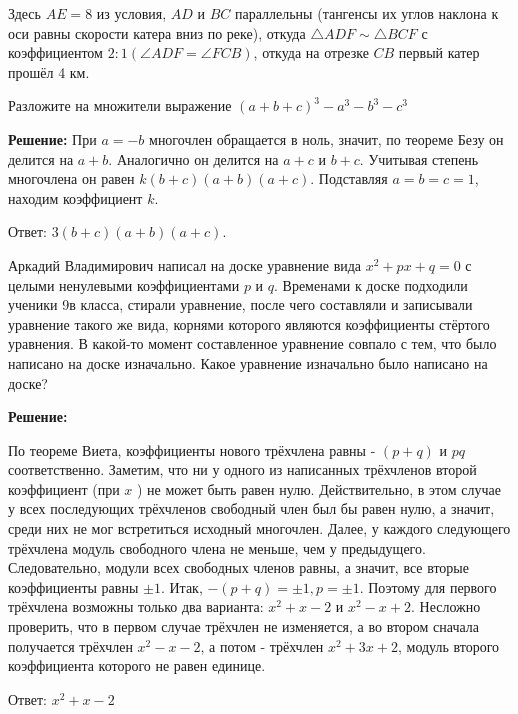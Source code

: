 Здесь $A E=8$ из условия, $A D$ и $B C$ параллельны (тангенсы их углов наклона к оси равны скорости катера вниз по реке), откуда $\triangle A D F \sim \triangle B C F$ с коэффициентом $2: 1(\angle A D F=\angle F C B)$, откуда на отрезке $C B$ первый катер прошёл 4 км.

Разложите на множители выражение $(a + b + c)^3 - a^3 - b^3 - c^3$

\textbf{Решение:}
При $a=-b$ многочлен обращается в ноль, значит, по теореме Безу он делится на $a+b$. Аналогично он делится на $a+c$ и $b+c$. Учитывая степень многочлена он равен $k(b+c)(a+b)(a+c)$. Подставляя $a=b=c=1$, находим коэффициент $k$.

Ответ: $3(b+c)(a+b)(a+c)$.

Аркадий Владимирович написал на доске уравнение вида  $x^2 + px + q = 0$  с целыми ненулевыми коэффициентами $p$ и $q$. Временами к доске подходили ученики 9в класса, стирали уравнение, после чего составляли и записывали уравнение такого же вида, корнями которого являются коэффициенты стёртого уравнения. В какой-то момент составленное уравнение совпало с тем, что было написано на доске изначально. Какое уравнение изначально было написано на доске?

\textbf{Решение:}

По теореме Виета, коэффициенты нового трёхчлена равны - $(p+q)$ и $p q$ соответственно. Заметим, что ни у одного из написанных трёхчленов второй коэффициент (при $x$ ) не может быть равен нулю. Действительно, в этом случае у всех последующих трёхчленов свободный член был бы равен нулю, а значит, среди них не мог встретиться исходный многочлен. Далее, у каждого следующего трёхчлена модуль свободного члена не меньше, чем у предыдущего. Следовательно, модули всех свободных членов равны, а значит, все вторые коэффициенты равны $\pm 1$. Итак, $-(p+q)= \pm 1, p= \pm 1$. Поэтому для первого трёхчлена возможны только два варианта: $x^2+x-2$ и $x^2-x+2$. Несложно проверить, что в первом случае трёхчлен не изменяется, а во втором сначала получается трёхчлен $x^2-x-2$, а потом - трёхчлен $x^2+3 x+2$, модуль второго коэффициента которого не равен единице.

Ответ: $x^2+x-2$